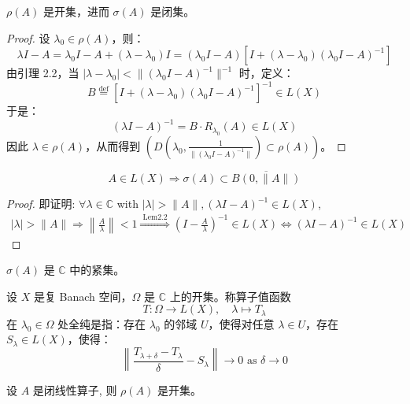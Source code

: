 \documentclass[lang=cn,newtx,10pt,scheme=chinese,thmcnt=chapter]{elegantbook}
\begin{document}
\begin{theorem}
$\rho(A)$ 是开集，进而 $\sigma(A)$ 是闭集。
\end{theorem}

\begin{proof}
设 $\lambda_0 \in \rho(A)$，则：
\[
\lambda I - A = \lambda_0 I - A + (\lambda - \lambda_0) I = (\lambda_0 I - A) \left[ I + (\lambda - \lambda_0) (\lambda_0 I - A)^{-1} \right]
\]
由引理 2.2，当 $|\lambda - \lambda_0| < \| (\lambda_0 I - A)^{-1} \|^{-1}$ 时，定义：
\[
B \stackrel{\text{def}}{=} \left[ I + (\lambda - \lambda_0) (\lambda_0 I - A)^{-1} \right]^{-1} \in L(X)
\]
于是：
\[
(\lambda I - A)^{-1} = B \cdot R_{\lambda_0}(A) \in L(X)
\]
因此 $\lambda \in \rho(A)$，从而得到 $\left( D \left( \lambda_0, \frac{1}{\| (\lambda_0 I - A)^{-1} \|} \right) \subset \rho(A) \right)$。
\end{proof}
\begin{proposition}
\begin{equation*}
A \in L (X) \Rightarrow \sigma(A) \subset \overline{ B(0,\|A\|)}
\end{equation*}
\end{proposition}
\begin{proof}
即证明: $\forall \lambda \in \mathbb{C}$ with $|\lambda|>\|A\|,(\lambda I-A)^{-1} \in L (X)$,
\begin{equation*}
\begin{aligned}
|\lambda|>\|A\|  \Rightarrow\left\|\frac{A}{\lambda}\right\|<1 
\stackrel{\text { Lem2.2 }}{\Rightarrow}  \left(I-\frac{A}{\lambda}\right)^{-1} \in L (X)  \Leftrightarrow(\lambda I-A)^{-1} \in L (X)
\end{aligned}
\end{equation*}
\end{proof}
\begin{corollary}
$\sigma(A)$ 是 $\mathbb{C}$ 中的紧集。
\end{corollary}

\begin{definition}
设 $X$ 是复 Banach 空间，$\Omega$ 是 $\mathbb{C}$ 上的开集。称算子值函数
\[
T: \Omega \rightarrow L(X), \quad \lambda \mapsto T_\lambda
\]
在 $\lambda_0 \in \Omega$ 处全纯是指：存在 $\lambda_0$ 的邻域 $U$，使得对任意 $\lambda \in U$，存在 $S_\lambda \in L(X)$，使得：
\[
\left\| \frac{T_{\lambda + \delta} - T_\lambda}{\delta} - S_\lambda \right\| \to 0 \text{ as } \delta \to 0
\]
\end{definition}
\begin{theorem}
设 $A$ 是闭线性算子, 则 $\rho(A)$ 是开集。
\end{theorem}
\end{document}
